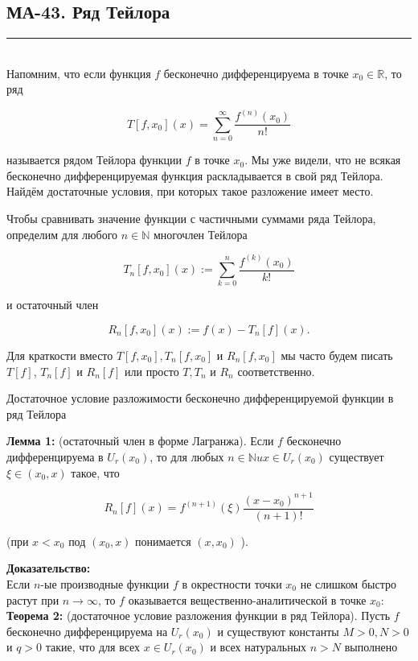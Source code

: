 \documentclass[a4paper,12pt]{article} %
\newcommand{\HRule}{\rule{\linewidth}{0.5mm}}
\begin{document}
\newpage
\begin{LARGE}
\begin{center}
	\section{МА-43. Ряд Тейлора }
\end{center}
\end{LARGE}
\HRule \\


Напомним, что если функция $f$ бесконечно дифференцируема в точке $x_{0} \in \mathbb{R}$, то ряд

$$
T\left[f, x_{0}\right](x)=\sum_{n=0}^{\infty} \frac{f^{(n)}\left(x_{0}\right)}{n !}
$$

называется рядом Тейлора функции $f$ в точке $x_{0}$. Мы уже видели, что не всякая бесконечно дифференцируемая функция раскладывается в свой ряд Тейлора. Найдём достаточные условия, при которых такое разложение имеет место.

Чтобы сравнивать значение функции с частичными суммами ряда Тейлора, определим для любого $n \in \mathbb{N}$ многочлен Тейлора

$$
T_{n}\left[f, x_{0}\right](x):=\sum_{k=0}^{n} \frac{f^{(k)}\left(x_{0}\right)}{k !}
$$

и остаточный член

$$
R_{n}\left[f, x_{0}\right](x):=f(x)-T_{n}[f](x) .
$$

Для краткости вместо $T\left[f, x_{0}\right], T_{n}\left[f, x_{0}\right]$ и $R_{n}\left[f, x_{0}\right]$ мы часто будем писать $T[f]$, $T_{n}[f]$ и $R_{n}[f]$ или просто $T, T_{n}$ и $R_{n}$ соответственно.

Достаточное условие разложимости бесконечно дифференцируемой функции в ряд Тейлора

\textbf{Лемма 1:} (остаточный член в форме Лагранжа). Если $f$ бесконечно дифференцируема в $U_{r}\left(x_{0}\right)$, то для любых $n \in \mathbb{N} u x \in U_{r}\left(x_{0}\right)$ существует $\xi \in\left(x_{0}, x\right)$ такое, что

$$
R_{n}[f](x)=f^{(n+1)}(\xi) \frac{\left(x-x_{0}\right)^{n+1}}{(n+1) !}
$$

(при $x<x_{0}$ под $\left(x_{0}, x\right)$ понимается $\left(x, x_{0}\right)$ ).

\textbf{Доказательство:}\\
Если $n$-ые производные функции $f$ в окрестности точки $x_{0}$ не слишком быстро растут при $n \rightarrow \infty$, то $f$ оказывается вещественно-аналитической в точке $x_{0}:$\\
\textbf{Теорема 2:} (достаточное условие разложения функции в ряд Тейлора). Пусть $f$ бесконечно дифференцируема на $U_{r}\left(x_{0}\right)$ и существуют константы $M>0, N>0$ и $q>0$ такие, что для всех $x \in U_{r}\left(x_{0}\right)$ и всех натуральных $n>N$ выполнено
\end{document}
